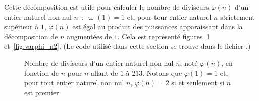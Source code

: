 \begin{multicols}{4}

\end{multicols}

\noindent
Cette décomposition est utile pour calculer le nombre de diviseurs $\varphi(n)$ d'un entier naturel non nul $n$ : $\varpi(1) = 1$ et, pour tour entier naturel $n$ strictement supérieur à $1$, $\varphi(n)$ est égal au produit des puissances apparaissant dans la décomposition de $n$ augmentées de $1$. 
Cela est représenté figures~\ref{fig:varphi_n} et~\ref{fig:varphi_n2}.
(Le code utilisé dans cette section se trouve dans le fichier .)

\begin{figure} 
    \centering
    \caption{Nombre de diviseurs d'un entier naturel non nul $n$, noté $\varphi(n)$, en fonction de $n$ pour $n$ allant de $1$ à $213$. 
             Notons que $\varphi(1) = 1$ et, pour tout entier naturel non nul $n$, $\varphi(n) = 2$ si et seulement si $n$ est premier.}
    \label{fig:varphi_n}
\end{figure}

